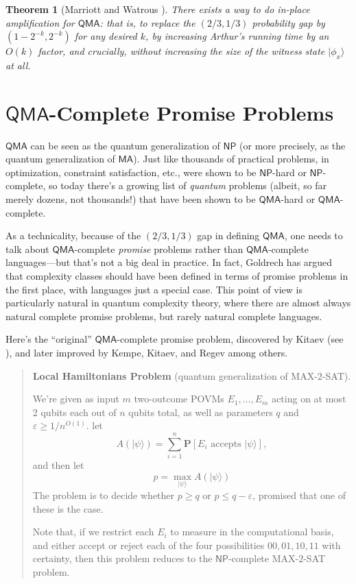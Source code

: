 \documentclass[11pt]{report}
\theoremstyle{plain}
\newtheorem{theorem}{Theorem}[section]
\theoremstyle{definition}
\newcommand{\eps}{\varepsilon}
\renewcommand{\Pr}{\mathbf{P}}
\renewcommand{\ket}[1]{|#1\rangle}
\begin{document}
\begin{theorem}[Marriott and Watrous \cite{DBLP:journals/cc/MarriottW05}]
There exists a way to do {\em in-place amplification} for $\mathsf{QMA}$: that is, to replace the $(2/3,1/3)$ probability gap by $(1-2^{-k},2^{-k})$ for any desired $k$, by increasing Arthur's running time by an $O(k)$ factor, and crucially, without increasing the size of the witness state $\ket{\phi_x}$ at all.
\end{theorem}

\section{$\mathsf{QMA}$-Complete Promise Problems}

$\mathsf{QMA}$ can be seen as the quantum generalization of $\mathsf{NP}$ (or more precisely, as the quantum generalization of $\mathsf{MA}$). Just like thousands of practical problems, in optimization, constraint satisfaction, etc., were shown to be $\mathsf{NP}$-hard or $\mathsf{NP}$-complete, so today there's a growing list of {\em quantum} problems (albeit, so far merely dozens, not thousands!) that have been shown to be $\mathsf{QMA}$-hard or $\mathsf{QMA}$-complete.

As a technicality, because of the $(2/3,1/3)$ gap in defining $\mathsf{QMA}$, one needs to talk about $\mathsf{QMA}$-complete {\em promise} problems rather than $\mathsf{QMA}$-complete languages---but that's not a big deal in practice.  In fact, Goldrech \cite{goldreich:promise} has argued that complexity classes should have been defined in terms of promise problems in the first place, with languages just a special case.  This point of view is particularly natural in quantum complexity theory, where there are almost always natural complete promise problems, but rarely natural complete languages.

Here's the ``original'' $\mathsf{QMA}$-complete promise problem, discovered by Kitaev (see \cite{KSV02}), and later improved by Kempe, Kitaev, and Regev \cite{kkr} among others.

\begin{quote}
\textbf{Local Hamiltonians Problem} (quantum generalization of MAX-$2$-SAT).

We're given as input $m$ two-outcome POVMs $E_1,\dots, E_m$ acting on at most $2$ qubits each out of $n$ qubits total, as well as parameters $q$ and $\eps \geq 1/n^{O(1)}$.  let
$$A(\ket{\psi}) = \sum_{i=1}^n \Pr[\text{$E_i$ accepts $\ket{\psi}$}],$$
and then let
$$p = \max_{\ket{\psi}} A(\ket{\psi})$$
The problem is to decide whether $p \geq q$ or $p \leq q - \eps$, promised that one of these is the case.

Note that, if we restrict each $E_i$ to measure in the computational basis, and either accept or reject each of the four possibilities $00,01,10,11$ with certainty, then this problem reduces to the $\mathsf{NP}$-complete MAX-$2$-SAT problem.
\end{quote}
\end{document}
